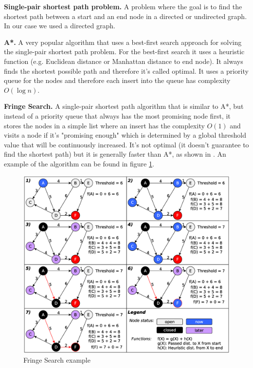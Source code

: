 \documentclass[letterpaper]{article}
\newcommand{\mypar}[1]{{\bf #1.}}
\begin{document}
\mypar{Single-pair shortest path problem}
A problem where the goal is to find the shortest path between a start and an end node in a directed or undirected graph. In our case we used a directed graph.

\mypar{A*}
A very popular algorithm that uses a best-first search approach for solving the single-pair shortest path problem. For the best-first search it uses a heuristic function (e.g. Euclidean distance or Manhattan distance to end node). It always finds the shortest possible path and therefore it's called optimal. It uses a priority queue for the nodes and therefore each insert into the queue has complexity $O(\log n)$.

\mypar{Fringe Search}
A single-pair shortest path algorithm that is similar to A*, but instead of a priority queue that always has the most promising node first, it stores the nodes in a simple list where an insert has the complexity $O(1)$ and visits a node if it's "promising enough" which is determined by a global threshold value that will be continuously increased. It's not optimal (it doesn't guarantee to find the shortest path) but it is generally faster than A*, as shown in \cite{fringe:05}. An example of the algorithm can be found in figure \ref{fig:algo}.

\begin{figure}[h]\centering
  \includegraphics[scale=0.245]{fringe_rep.eps}
  \caption{Fringe Search example \label{fig:algo}}
\end{figure}
\end{document}
